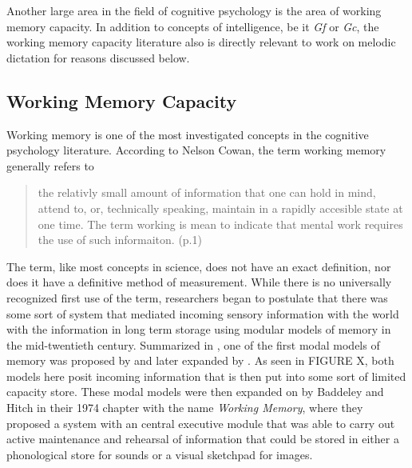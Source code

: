 \documentclass[]{book}
\theoremstyle{definition}
\theoremstyle{definition}
\theoremstyle{definition}
\theoremstyle{remark}
\begin{document}
Another large area in the field of cognitive psychology is the area of
working memory capacity. In addition to concepts of intelligence, be it
\emph{Gf} or \emph{Gc}, the working memory capacity literature also is
directly relevant to work on melodic dictation for reasons discussed
below.

\hypertarget{working-memory-capacity}{%
\subsection{Working Memory Capacity}\label{working-memory-capacity}}

Working memory is one of the most investigated concepts in the cognitive
psychology literature. According to Nelson Cowan, the term working
memory generally refers to

\begin{quote}
the relativly small amount of information that one can hold in mind,
attend to, or, technically speaking, maintain in a rapidly accesible
state at one time. The term working is mean to indicate that mental work
requires the use of such informaiton. (p.1)
\citep{cowanWorkingMemoryCapacity2005}
\end{quote}

The term, like most concepts in science, does not have an exact
definition, nor does it have a definitive method of measurement. While
there is no universally recognized first use of the term, researchers
began to postulate that there was some sort of system that mediated
incoming sensory information with the world with the information in long
term storage using modular models of memory in the mid-twentieth
century. Summarized in \citep{cowanWorkingMemoryCapacity2005}, one of
the first modal models of memory was proposed by
\citep{broadbentPerceptionCommunication1958} and later expanded by
\citep{atkinsonHUMANMEMORYPROPOSED1968}. As seen in FIGURE X, both
models here posit incoming information that is then put into some sort
of limited capacity store. These modal models were then expanded on by
Baddeley and Hitch \citep{baddeleyWorkingMemory1974} in their 1974
chapter with the name \emph{Working Memory}, where they proposed a
system with an central executive module that was able to carry out
active maintenance and rehearsal of information that could be stored in
either a phonological store for sounds or a visual sketchpad for images.
\end{document}
